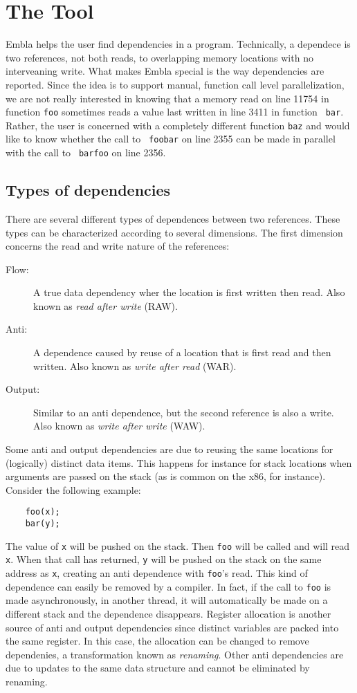\section{The Tool}

Embla helps the user find dependencies in a program. Technically, a
dependece is two references, not both reads, to overlapping memory
locations with no interveaning write. What makes Embla special is the
way dependencies are reported. Since the idea is to support manual,
function call level parallelization, we are not really interested in
knowing that a memory read on line 11754 in function {\tt foo}
sometimes reads a value last written in line 3411 in function {\tt
bar}. Rather, the user is concerned with a completely different
function {\tt baz} and would like to know whether the call to {\tt
foobar} on line 2355 can be made in parallel with the call to {\tt
barfoo} on line 2356.



\subsection{Types of dependencies}

There are several different types of dependences between two
references. These types can be characterized according to several
dimensions. The first dimension concerns the read and write nature of
the references:
\begin{description}
\item[Flow:]
A true data dependency wher the location is first written then
read. Also known as {\em read after write} (RAW).
\item[Anti:]
A dependence caused by reuse of a location that is first read and then
written. Also known as {\em write after read} (WAR).
\item[Output:]
Similar to an anti dependence, but the second reference is also a
write. Also known as {\em write after write} (WAW).
\end{description}
Some anti and output dependencies are due to reusing the same
locations for (logically) distinct data items. This happens for
instance for stack locations when arguments are passed on the stack
(as is common on the x86, for instance). Consider the following
example:
\begin{verbatim}
    foo(x);
    bar(y);
\end{verbatim}
The value of {\tt x} will be pushed on the stack. Then {\tt foo} will
be called and will read {\tt x}. When that call has returned, {\tt y}
will be pushed on the stack on the same address as {\tt x}, creating
an anti dependence with {\tt foo}'s read. This kind of dependence can 
easily be removed by a
compiler. In fact, if the call to {\tt foo} is made asynchronously, in
another thread, it will automatically be made on a different stack and
the dependence disappears. Register allocation is another source of
anti and output dependencies since distinct variables are packed into
the same register. In this case, the allocation can be changed to
remove dependenies, a transformation known as {\em renaming}. 
Other anti dependencies are due to updates
to the same data structure and cannot be eliminated by renaming.

